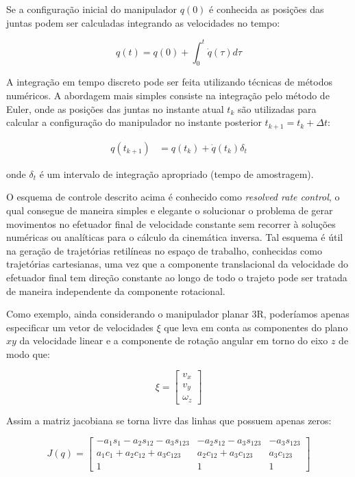 Se a configuração inicial do manipulador \(q(0)\) é conhecida as posições das
juntas podem ser calculadas integrando as velocidades no tempo:

\begin{equation}
    q(t) = q(0) + \int_{0}^{t} \dot{q}(\tau) d\tau
\end{equation}

A integração em tempo discreto pode ser feita utilizando técnicas de métodos
numéricos. A abordagem mais simples consiste na integração pelo método de
Euler, onde as posições das juntas no instante atual \(t_k\) são utilizadas
para calcular a configuração do manipulador no instante posterior \(t_{k+1} =
t_k + \Delta t\):

\begin{align}
    q(t_{k + 1}) & = q(t_k) + \dot{q}(t_k) \delta_t
\end{align}

onde \(\delta_t\) é um intervalo de integração apropriado (tempo de
amostragem).

O esquema de controle descrito acima é conhecido como \emph{resolved rate
    control}, o qual consegue de maneira simples e elegante o solucionar o problema
de gerar movimentos no efetuador final de velocidade constante sem recorrer à
soluções numéricas ou analíticas para o cálculo da cinemática inversa. Tal
esquema é útil na geração de trajetórias retilíneas no espaço de trabalho,
conhecidas como trajetórias cartesianas, uma vez que a componente translacional
da velocidade do efetuador final tem direção constante ao longo de todo o
trajeto pode ser tratada de maneira independente da componente rotacional.

Como exemplo, ainda considerando o manipulador planar 3R, poderíamos apenas
especificar um vetor de velocidades \(\xi\) que leva em conta as componentes do
plano \(xy\) da velocidade linear e a componente de rotação angular em torno do
eixo \(z\) de modo que:

\begin{equation}
    \xi = \begin{bmatrix}
        v_x \\
        v_y \\
        \omega_z
    \end{bmatrix}
\end{equation}

Assim a matriz jacobiana se torna livre das linhas que possuem apenas zeros:

\begin{equation}
    J(q) = \begin{bmatrix}
        -a_1 s_1 - a_2 s_{12} - a_3 s_{123} & -a_2 s_{12} - a_3 s_{123} & -a_3 s_{123} \\
        a_1 c_1 + a_2 c_{12} + a_3 c_{123}  & a_2 c_{12} + a_3 c_{123}  & a_3 c_{123}  \\
        1                                   & 1                         & 1
    \end{bmatrix}
\end{equation}

